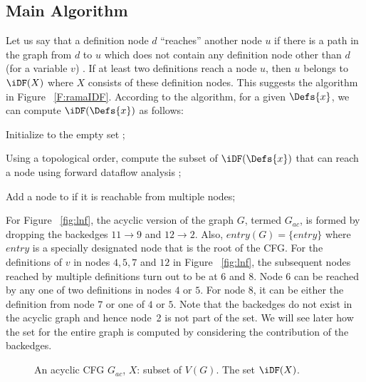 {    \subsection{Main Algorithm}
    
Let us say that a definition node $d$ ``reaches'' another node $u$ if there is a path in the graph from $d$ to $u$ which does not contain any definition node other than $d$ (for a variable $v$) . If at least two definitions reach a node $u$, then $u$ belongs to $\iDF(X)$ where $X$ consists of these definition nodes. This suggests the algorithm in Figure ~\ref{F:ramaIDF}. According to the algorithm, for a given $\Defs{x}$, we can compute $\iDF(\Defs{x})$ as follows:
\begin{itemize}
\item { Initialize \iDF to the empty set };
\item { Using a topological order, compute the subset of $\iDF(\Defs{x})$ that can reach a node using forward dataflow analysis };
{\item} {Add a node to \iDF if it is reachable from multiple nodes};
\end{itemize}  

    For Figure ~\ref{fig:lnf}, the acyclic version of the graph $G$, termed $G_{ac}$, is formed by dropping the backedges $11 \rightarrow 9$ and $12 \rightarrow 2$. Also, $entry(G) = \{entry\}$ where $entry$ is a specially designated node that is the root of the CFG. For the definitions of $v$ in nodes $4,5,7$ and $12$ in Figure ~\ref{fig:lnf}, the subsequent nodes reached by multiple definitions turn out to be at $6$ and $8$. Node $6$ can be reached by any one of two definitions in nodes $4$ or $5$. For node $8$, it can be either the definition from node $7$ or one of $4$ or $5$. Note that the backedges do not exist in the acyclic graph and hence node~2 is not part of the \iDF set. We will see later how the \iDF set for the entire graph is computed by considering the contribution of the backedges. 



    
   \begin{figure}[!ht]
   \centering
  \begin{minipage}[t]{5in}
   An acyclic CFG $G_{ac}$, $X$: subset of $V(G)$.
   The set $\iDF(X)$.
  \setcounter{linectr}{0}


\end{minipage}
\end{figure}}
